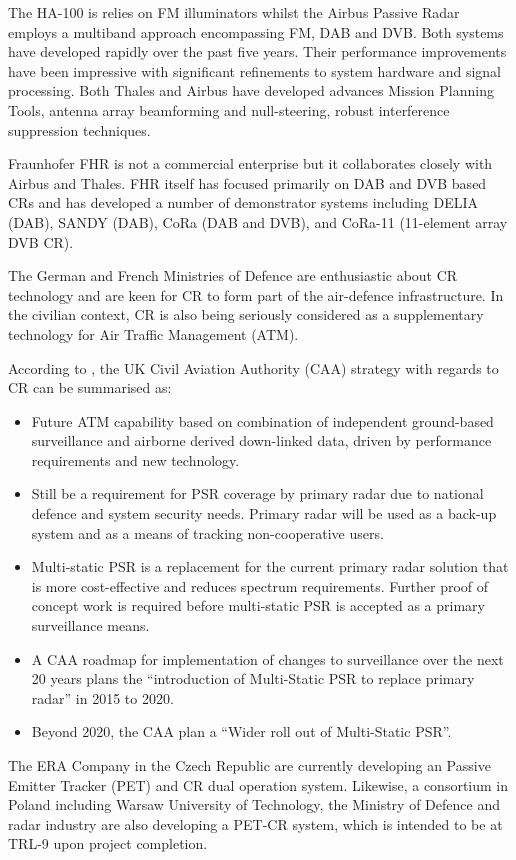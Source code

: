The HA-100 is relies on FM illuminators whilst the Airbus Passive Radar employs a multiband approach encompassing FM, DAB and DVB. Both systems have developed rapidly over the past five years. Their performance improvements have been impressive with significant refinements to system hardware and signal processing. Both Thales and Airbus have developed advances Mission Planning Tools, antenna array beamforming and null-steering, robust interference suppression techniques.

Fraunhofer FHR is not a commercial enterprise but it collaborates closely with Airbus and Thales. FHR itself has focused primarily on DAB and DVB based CRs and has developed a number of demonstrator systems including DELIA (DAB), SANDY (DAB), CoRa (DAB and DVB), and CoRa-11 (11-element array DVB CR).

The German and French Ministries of Defence are enthusiastic about CR technology and are keen for CR to form part of the air-defence infrastructure.  In the civilian context, CR is also being seriously considered as a supplementary technology for Air Traffic Management (ATM).

According to \cite{caa_1}, the UK Civil Aviation Authority (CAA) strategy with regards to CR can be summarised as:

\begin{itemize}
\item Future ATM capability based on combination of independent ground-based surveillance and airborne derived down-linked data, driven by performance requirements and new technology.

\item Still be a requirement for PSR coverage by primary radar due to national defence and system security needs. Primary radar will be used as a back-up system and as a means of tracking non-cooperative users. 

\item Multi-static PSR is a replacement for the current primary radar solution that is more cost-effective and reduces spectrum requirements. Further proof of concept work is required before multi-static PSR is accepted as a primary surveillance means.

\item A CAA roadmap for implementation of changes to surveillance over the next 20 years plans the ``introduction of Multi-Static PSR to replace primary radar'' in 2015 to 2020.

\item Beyond 2020, the CAA plan a ``Wider roll out of Multi-Static PSR''.
 
\end{itemize}

The ERA Company in the Czech Republic are currently developing an Passive Emitter Tracker (PET) and CR dual operation system. Likewise, a consortium in Poland including Warsaw University of Technology, the Ministry of Defence and radar industry are also developing a PET-CR system, which is intended to be at TRL-9 upon project completion.

 